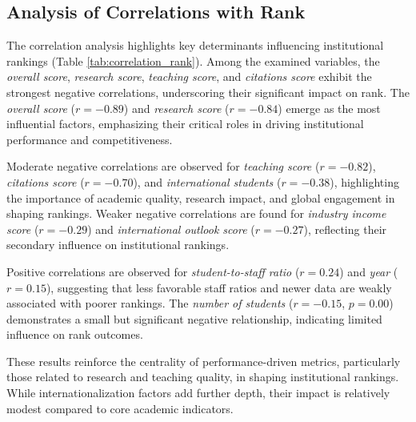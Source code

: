 \documentclass[sigconf]{acmart}
\begin{document}
\subsection{Analysis of Correlations with Rank}

The correlation analysis highlights key determinants influencing institutional rankings (Table \ref{tab:correlation_rank}). Among the examined variables, the \textit{overall score}, \textit{research score}, \textit{teaching score}, and \textit{citations score} exhibit the strongest negative correlations, underscoring their significant impact on rank. The \textit{overall score} ($r = -0.89$) and \textit{research score} ($r = -0.84$) emerge as the most influential factors, emphasizing their critical roles in driving institutional performance and competitiveness.

Moderate negative correlations are observed for \textit{teaching score} ($r = -0.82$), \textit{citations score} ($r = -0.70$), and \textit{international students} ($r = -0.38$), highlighting the importance of academic quality, research impact, and global engagement in shaping rankings. Weaker negative correlations are found for \textit{industry income score} ($r = -0.29$) and \textit{international outlook score} ($r = -0.27$), reflecting their secondary influence on institutional rankings.

Positive correlations are observed for \textit{student-to-staff ratio} ($r = 0.24$) and \textit{year} ($r = 0.15$), suggesting that less favorable staff ratios and newer data are weakly associated with poorer rankings. The \textit{number of students} ($r = -0.15$, $p = 0.00$) demonstrates a small but significant negative relationship, indicating limited influence on rank outcomes.

These results reinforce the centrality of performance-driven metrics, particularly those related to research and teaching quality, in shaping institutional rankings. While internationalization factors add further depth, their impact is relatively modest compared to core academic indicators.
\end{document}
